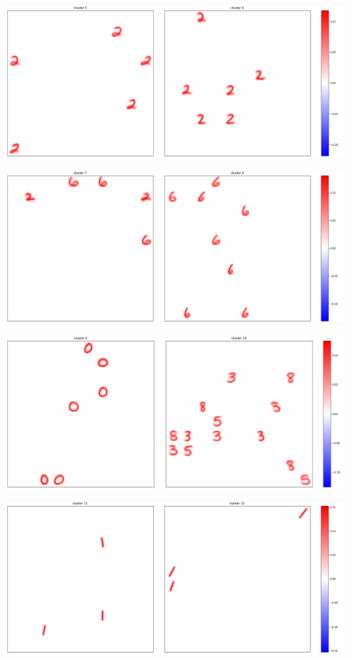 \documentclass[a4paper]{report}
\begin{document}
\begin{figure} [H]
    \centering
    \includegraphics [width=\textwidth ] {c/e/5.png}
    \caption{}
\end{figure}

\begin{figure} [H]
    \centering
    \includegraphics [width=\textwidth ] {c/e/7.png}
    \caption{}
\end{figure}

\begin{figure} [H]
    \centering
    \includegraphics [width=\textwidth ] {c/e/9.png}
    \caption{}
\end{figure}

\begin{figure} [H]
    \centering
    \includegraphics [width=\textwidth ] {c/e/11.png}
    \caption{}
\end{figure}
\end{document}
